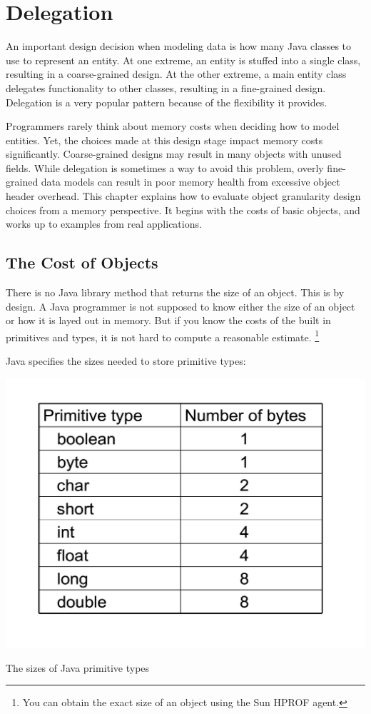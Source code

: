 \documentclass{book}
\theoremstyle{definition}
\begin{document}
\chapter{Delegation}

An important design decision when modeling data is how many Java classes to use to represent an entity. At one extreme, an entity is stuffed into a single class, resulting in a coarse-grained design. At the other extreme, a main entity class delegates functionality to other classes, resulting in a fine-grained design.  Delegation is a very popular pattern because of the flexibility it provides. 

Programmers rarely think about memory costs when deciding how to model entities. Yet, the choices made at this design stage impact memory costs significantly. Coarse-grained designs may result in many objects with unused fields. While delegation is sometimes a way to avoid this problem, overly fine-grained data models can result in poor memory health from excessive object header overhead. This chapter explains how to evaluate object granularity design choices from a memory perspective. It begins with the costs of basic objects, and works up to examples from real applications.
  
\section{The Cost of Objects}


There is no Java library method that returns the size of an object. This is by design. A Java programmer is not supposed to know either the size of an object or how it is layed out in memory. But if you know the costs of the built in primitives and types, it is not hard to compute a reasonable estimate.
\footnote{You can obtain the exact size of an object using the Sun HPROF agent.}  

Java specifies the sizes needed to store primitive types:
\begin{table}
  \centering
 \includegraphics[width=.40\textwidth]{Figures/chapter4/primitive-byte-sizes.pdf}
  \caption{The sizes of Java primitive types}
  \label{tab:primitive-sizes}
\end{table}
\end{document}
